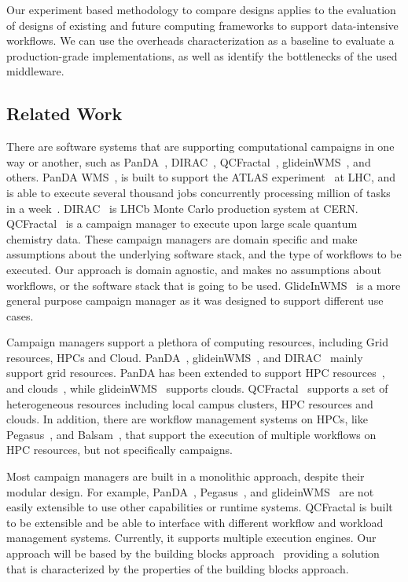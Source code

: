 Our experiment based methodology to compare designs applies to the evaluation of designs of existing and future computing frameworks to support data-intensive workflows.
We can use the overheads characterization as a baseline to evaluate a production-grade implementations, as well as identify the bottlenecks of the used middleware.


\subsection{Related Work}

There are software systems that are supporting computational campaigns in one way or another, such as PanDA~\cite{maeno2008panda}, DIRAC~\cite{casajus2010dirac}, QCFractal~\cite{qcfractal}, glideinWMS~\cite{sfiligoi2008glidein}, and others. 
PanDA WMS~\cite{maeno2008panda}, is built to support the ATLAS experiment~\cite{atlas} at LHC, and is able to execute several thousand jobs concurrently processing million of tasks in a week~\cite{de2015future}.
DIRAC~\cite{tsaregorodtsev2003dirac} is LHCb Monte Carlo production system at CERN.
QCFractal~\cite{qcfractal} is a campaign manager to execute upon large scale quantum chemistry data.
These campaign managers are domain specific and make assumptions about the underlying software stack, and the type of workflows to be executed.
Our approach is domain agnostic, and makes no assumptions about workflows, or the software stack that is going to be used.
GlideInWMS~\cite{sfiligoi2008glidein} is a more general purpose campaign manager as it was designed to support different use cases.

Campaign managers support a plethora of computing resources, including Grid resources, HPCs and Cloud.
PanDA~\cite{maeno2008panda}, glideinWMS~\cite{sfiligoi2008glidein}, and DIRAC~\cite{casajus2010dirac} mainly support grid resources.
PanDA has been extended to support HPC resources~\cite{de2015future, de2016accelerating}, and clouds~\cite{de2016accelerating}, while glideinWMS~\cite{sfiligoi2008glidein} supports clouds.
QCFractal~\cite{qcfractal} supports a set of heterogeneous resources including local campus clusters, HPC resources and clouds.
In addition, there are workflow management systems on HPCs, like Pegasus~\cite{deelman2015pegasus}, and Balsam~\cite{salim2019balsam}, that support the execution of multiple workflows on HPC resources, but not specifically campaigns.

Most campaign managers are built in a monolithic approach, despite their modular design.
For example, PanDA~\cite{maeno2008panda}, Pegasus~\cite{deelman2015pegasus}, and glideinWMS~\cite{sfiligoi2008glidein} are not easily extensible to use other capabilities or runtime systems.
QCFractal is built to be extensible and be able to interface with different workflow and workload management systems. Currently, it supports multiple execution engines.
Our approach will be based by the building blocks approach~\cite{turilli2019middleware} providing a solution that is characterized by the properties of the building blocks approach.